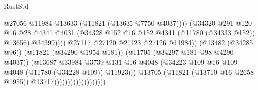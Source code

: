 \begin{lexlean}{RustStd}
\begin{coremodule}
                                                          @27056
                                                          @11984
                                                          @13633
                                                          (@11821 (@13635 @7750 @4037))))
                                                      (@34320
                                                        @291
                                                        @120
                                                        @16
                                                        @28
                                                        @4341
                                                        @4031
                                                        (@34328
                                                          @152
                                                          @16
                                                          @152
                                                          @4341
                                                          (@11780 (@34333 @152))
                                                          @13656)
                                                        @34399))))
                                                @27117
                                                @27120
                                                @27123
                                                @27126
                                                @11984))
                                            (@13482 (@34285 @96))
                                            (@11821 (@34290 @1954 @181))
                                            (@11705 (@34297 @181 @98 @4290 @4037))
                                            (@13687
                                              @33984
                                              @3739
                                              @131
                                              @16
                                              @4048
                                              (@34223
                                                @109
                                                @16
                                                @109
                                                @4048
                                                (@11780 (@34228 @109))
                                                @11923)))
                                          @13705
                                          (@11821 (@13710 @16 @2658 @1955))
                                          @13717)))))))))))))))))))

\end{coremodule}
\end{lexlean}
